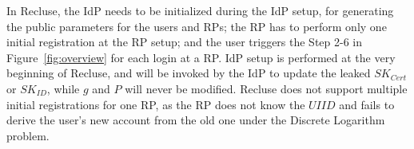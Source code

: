 In Recluse, the IdP needs to be initialized during the IdP setup, for generating the public parameters for the users and RPs; the RP has to perform only one initial registration at the RP setup; and  the user triggers the Step 2-6 in Figure~\ref{fig:overview} for each login at a RP. IdP setup is performed at the very beginning of Recluse, and will be invoked by the IdP to update the leaked $SK_{Cert}$ or $SK_{ID}$, while $g$ and $P$ will never be modified. Recluse does not support multiple initial registrations for one RP, as the RP does not know the $UIID$ and fails to derive the user's new account  from the old one under the Discrete Logarithm problem.


